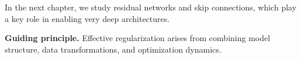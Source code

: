 \medskip

In the next chapter, we study residual networks and skip connections, which play a key role in enabling very deep architectures.

\medskip

\noindent
\textbf{Guiding principle.}  
Effective regularization arises from combining model structure, data transformations, and optimization dynamics.
